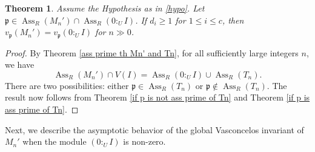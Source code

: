 \documentclass[11pt,reqno]{amsart}
\newtheorem{theorem}{Theorem}[section]
\theoremstyle{definition}
\newcommand{\p}{\mathfrak{p}}
\newcommand{\Ass}{\operatorname{Ass}}
\begin{document}
\begin{theorem}\label{whn p is in intersection of prime and colon}
    Assume the Hypothesis as in \ref{hypo}. Let $\p\in \Ass_R (M_n')\cap \Ass_R(0:_UI)$. If $d_i\geq 1$ for $1\leq i\leq c$, then $v_{\p}(M_n')=v_{\p}(0:_UI)$ for $n\gg 0$.
\end{theorem}
\begin{proof}
By Theorem \ref{ass prime th Mn' and Tn}, for all sufficiently large
integers $n$, we have
\[
\Ass_R(M_n')\cap V(I)
=
\Ass_R(0:_UI)\cup\Ass_R(T_n).
\]     
There are two possibilities: either $\p\in \Ass_R (T_n)$ or $\p\notin \Ass_R (T_n)$. The result now follows from Theorem \ref{if p is not ass prime of Tn} and Theorem \ref{if p is ass prime of Tn}.
\end{proof}
Next, we describe the asymptotic behavior of the global Vasconcelos invariant of $M_n'$ when the module $(0:_UI)$ is non-zero.
\end{document}
